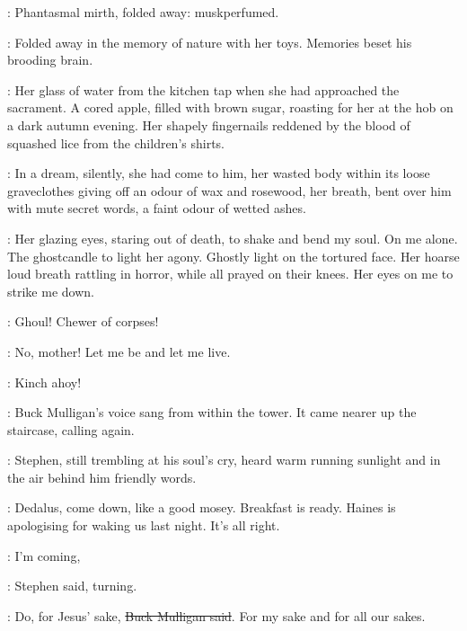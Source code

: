 \begin{verse}
\end{verse}

\StephenInt:
Phantasmal mirth,
folded away:
muskperfumed.

\begin{verse}
\end{verse}

:
Folded away in the memory of nature with her toys.
Memories beset his brooding brain.

\StephenInt:
Her glass of water from the kitchen tap
when she had approached the sacrament.
A cored apple, filled with brown sugar,
roasting for her at the hob on a dark autumn evening.
Her shapely fingernails
reddened by the blood of squashed lice from the children's shirts.

:
In a dream,
silently,
she had come to him,
her wasted body within its loose graveclothes
giving off an odour of wax and rosewood,
her breath,
bent over him with mute secret words,
a faint odour of wetted ashes.

\StephenInt:
Her glazing eyes,
staring out of death,
to shake and bend my soul.
On me alone.
The ghostcandle to light her agony.
Ghostly light on the tortured face.
Her hoarse loud breath rattling in horror,
while all prayed on their knees.
Her eyes on me to strike me down.

\StephenInt:
Ghoul! Chewer of corpses!

\StephenInt:
No, mother! Let me be and let me live.

\Mulligan:
Kinch ahoy!

:
Buck Mulligan's voice sang from within the tower.
It came nearer up the staircase,
calling again.

:
Stephen, still trembling at his soul's cry,
heard warm running sunlight
and in the air behind him
friendly words.

\Mulligan:
Dedalus,
come down, like a good mosey.
Breakfast is ready.
Haines is apologising for waking us last night.
It's all right.

\Stephen:
I'm coming,

:
Stephen said, turning.

\Mulligan:
Do, for Jesus' sake,
\sout{Buck Mulligan said}.
For my sake and for all our sakes.


